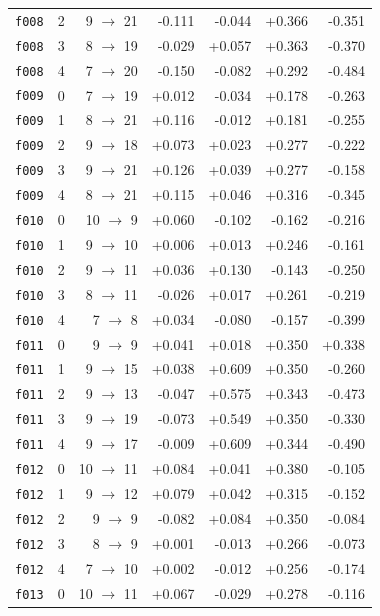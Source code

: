 \documentclass[11pt]{article}
\begin{document}
\begin{table}[htbp]
\begin{tabular}{llrrrrr}
\texttt{f008} & 2 & 9 $\to$ 21 & -0.111 & -0.044 & +0.366 & -0.351 \\
\texttt{f008} & 3 & 8 $\to$ 19 & -0.029 & +0.057 & +0.363 & -0.370 \\
\texttt{f008} & 4 & 7 $\to$ 20 & -0.150 & -0.082 & +0.292 & -0.484 \\
\texttt{f009} & 0 & 7 $\to$ 19 & +0.012 & -0.034 & +0.178 & -0.263 \\
\texttt{f009} & 1 & 8 $\to$ 21 & +0.116 & -0.012 & +0.181 & -0.255 \\
\texttt{f009} & 2 & 9 $\to$ 18 & +0.073 & +0.023 & +0.277 & -0.222 \\
\texttt{f009} & 3 & 9 $\to$ 21 & +0.126 & +0.039 & +0.277 & -0.158 \\
\texttt{f009} & 4 & 8 $\to$ 21 & +0.115 & +0.046 & +0.316 & -0.345 \\
\texttt{f010} & 0 & 10 $\to$ 9 & +0.060 & -0.102 & -0.162 & -0.216 \\
\texttt{f010} & 1 & 9 $\to$ 10 & +0.006 & +0.013 & +0.246 & -0.161 \\
\texttt{f010} & 2 & 9 $\to$ 11 & +0.036 & +0.130 & -0.143 & -0.250 \\
\texttt{f010} & 3 & 8 $\to$ 11 & -0.026 & +0.017 & +0.261 & -0.219 \\
\texttt{f010} & 4 & 7 $\to$ 8 & +0.034 & -0.080 & -0.157 & -0.399 \\
\texttt{f011} & 0 & 9 $\to$ 9 & +0.041 & +0.018 & +0.350 & +0.338 \\
\texttt{f011} & 1 & 9 $\to$ 15 & +0.038 & +0.609 & +0.350 & -0.260 \\
\texttt{f011} & 2 & 9 $\to$ 13 & -0.047 & +0.575 & +0.343 & -0.473 \\
\texttt{f011} & 3 & 9 $\to$ 19 & -0.073 & +0.549 & +0.350 & -0.330 \\
\texttt{f011} & 4 & 9 $\to$ 17 & -0.009 & +0.609 & +0.344 & -0.490 \\
\texttt{f012} & 0 & 10 $\to$ 11 & +0.084 & +0.041 & +0.380 & -0.105 \\
\texttt{f012} & 1 & 9 $\to$ 12 & +0.079 & +0.042 & +0.315 & -0.152 \\
\texttt{f012} & 2 & 9 $\to$ 9 & -0.082 & +0.084 & +0.350 & -0.084 \\
\texttt{f012} & 3 & 8 $\to$ 9 & +0.001 & -0.013 & +0.266 & -0.073 \\
\texttt{f012} & 4 & 7 $\to$ 10 & +0.002 & -0.012 & +0.256 & -0.174 \\
\texttt{f013} & 0 & 10 $\to$ 11 & +0.067 & -0.029 & +0.278 & -0.116 \\

\end{tabular}
\end{table}
\end{document}
